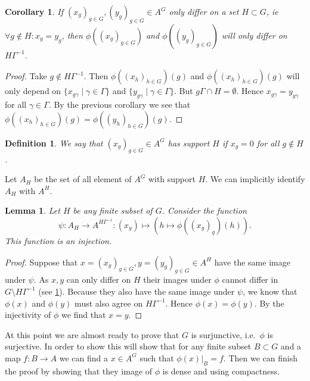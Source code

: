 \documentclass[titlepage, a4paper]{article}
\newtheorem{definition}[theorem]{Definition}
\newtheorem{lemma}[theorem]{Lemma}
\newtheorem{corollary}[theorem]{Corollary}
\theoremstyle{remark}
\begin{document}
\begin{corollary}\label{cor:differ_in_image}
	If $(x_g)_{g \in G}, (y_g)_{g\in G} \in A^{G}$ only differ on a set $H \subset G$, ie $\forall g \not\in H:x_g = y_g$,
	then  $\phi((x_g)_{g \in G})$ and $\phi((y_g)_{g \in G})$ will only differ on $H\Gamma^{-1}$.
\end{corollary}
\begin{proof}
	Take $g \not\in H\Gamma^{-1}$. Then $\phi((x_h)_{h \in G})(g)$ and $\phi((x_h)_{h\in G})(g)$ will only depend on  $\{x_{g\gamma}\mid \gamma \in \Gamma\}$ and $\{y_{g\gamma}\mid \gamma \in \Gamma\} $. But  $g\Gamma \cap H = \emptyset$. Hence $x_{g\gamma} = y_{g\gamma}$ for all $\gamma \in \Gamma$. By the previous corollary we see that $\phi((x_h)_{h \in G})(g) = \phi((y_h)_{h \in G})(g)$.
\end{proof}

\begin{definition}
	We say that $(x_g)_{g \in G} \in A^{G}$ has support $H$ if $x_g = 0$ for all $g \not\in H$.
\end{definition}
Let $A_H$ be the set of all element of  $A^{G}$ with support $H$. We can implicitly identify $A_H$ with $A^{H}$.

\begin{lemma}\label{lem:injective_restriction}
	Let $H$ be any finite subset of $G$. Consider the function  \[
		\psi:A_H \to A ^{H\Gamma^{-1}}: (x_g) \mapsto \left(h \mapsto \phi((x_g)_g)(h)\right)
	.\]  
	This function is an injection. 
\end{lemma}
\begin{proof}
	Suppose that $x= (x_g)_{g \in G}, y = (y_g)_{g \in G} \in A^{H}$ have the same image under $\psi$. As $x, y$ can only differ on $ H$ their images under $\phi$ cannot differ in $G\setminus H\Gamma^{-1}$ (see \cref{cor:differ_in_image}). Because they also have the same image under $\psi$, we know that $\phi(x)$ and $\phi(y)$ must also agree on $H\Gamma^{-1}$. Hence $\phi(x) = \phi(y)$. By the injectivity of $\phi$ we find that $x = y$.
\end{proof}

At this point we are almost ready to prove that $G$ is surjunctive, i.e.\ $\phi$ is surjective. 
In order to show this will show that for any finite subset $B\subset G$ and a map $f:B \to A$ we can find a $x \in A^{G}$ such that $\phi\left(x \right) |_B  = f$. Then we can finish the proof by showing that they image of $\phi$ is dense and using compactness.

\bigskip
\end{document}
